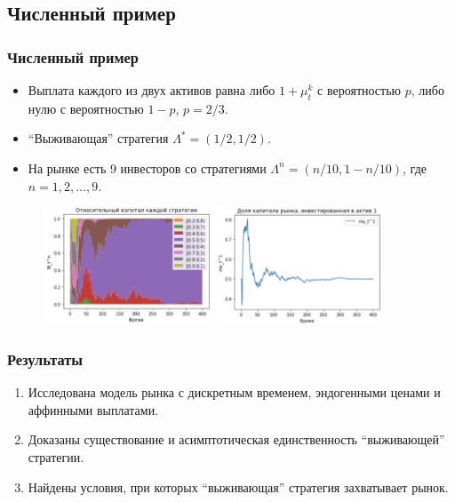 \documentclass[aspectratio=169]{beamer}
\theoremstyle{definition}
\theoremstyle{remark}
\begin{document}
\subsection{Численный пример}
\begin{frame}\frametitle{Численный пример}
    \begin{itemize}
    \item Выплата каждого из двух активов равна либо $1 + \mu_{t}^k$ с вероятностью $p$, либо нулю с вероятностью $1-p$, $p=2/3$.
    \item ``Выживающая'' стратегия $\Lambda^*=(1/2, 1/2)$.
    \item На рынке есть 9 инвесторов со стратегиями $\Lambda^n = (n/10, 1-n/10)$, где $n=1,2,\dots,9$.
    \end{itemize}	

    \begin{figure}
    \centering
    \includegraphics[height=3.5cm]{pictures/pic1-relative-wealth-all.png}\quad
    \includegraphics[height=3.5cm]{pictures/pic3-mut1-fraction.png}
     \end{figure}
\end{frame}




\begin{frame}\frametitle{Результаты}
	\begin{enumerate}
	\item{Исследована модель рынка с дискретным временем, эндогенными ценами и аффинными выплатами.}
        \item{Доказаны существование и асимптотическая единственность ``выживающей'' стратегии.}
        \item{Найдены условия, при которых ``выживающая'' стратегия захватывает рынок.}
       
	\end{enumerate}
\end{frame}
\end{document}
